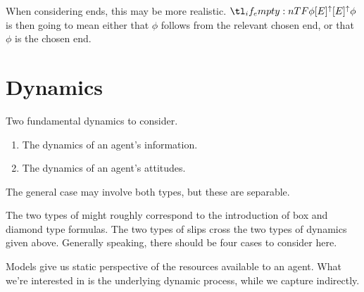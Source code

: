 \documentclass[10pt]{article}
\begin{document}

When considering ends, this may be more realistic.
\(\lattu[E]{\phi}\) is then going to mean either that \(\phi\) follows from the relevant chosen end, or that \(\phi\) is the chosen end.








\section{Dynamics}
\label{sec:dynamics}

Two fundamental dynamics to consider.
\begin{enumerate}
\item The dynamics of an agent's information.
\item The dynamics of an agent's attitudes.
\end{enumerate}
The general case may involve both types, but these are separable.

The two types of might roughly correspond to the introduction of box and diamond type formulas.
The two types of slips cross the two types of dynamics given above.
Generally speaking, there should be four cases to consider here.





Models give us static perspective of the resources available to an agent.
What we're interested in is the underlying dynamic process, while we capture indirectly.





\end{document}
